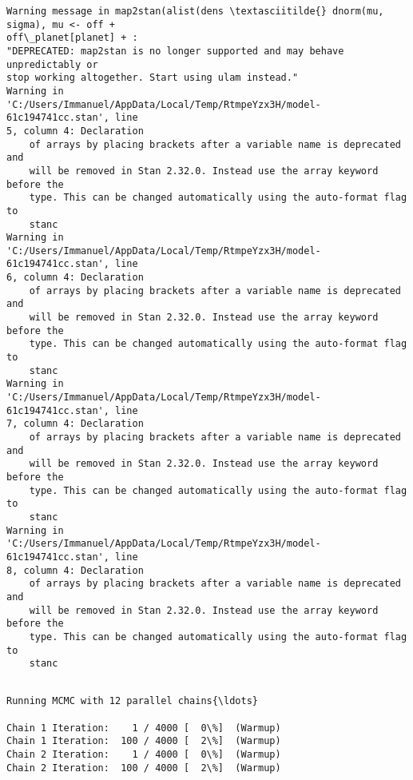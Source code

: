 \documentclass[11pt]{article}
\begin{document}
    \begin{Verbatim}[commandchars=\\\{\}]
Warning message in map2stan(alist(dens \textasciitilde{} dnorm(mu, sigma), mu <- off +
off\_planet[planet] + :
"DEPRECATED: map2stan is no longer supported and may behave unpredictably or
stop working altogether. Start using ulam instead."
Warning in
'C:/Users/Immanuel/AppData/Local/Temp/RtmpeYzx3H/model-61c194741cc.stan', line
5, column 4: Declaration
    of arrays by placing brackets after a variable name is deprecated and
    will be removed in Stan 2.32.0. Instead use the array keyword before the
    type. This can be changed automatically using the auto-format flag to
    stanc
Warning in
'C:/Users/Immanuel/AppData/Local/Temp/RtmpeYzx3H/model-61c194741cc.stan', line
6, column 4: Declaration
    of arrays by placing brackets after a variable name is deprecated and
    will be removed in Stan 2.32.0. Instead use the array keyword before the
    type. This can be changed automatically using the auto-format flag to
    stanc
Warning in
'C:/Users/Immanuel/AppData/Local/Temp/RtmpeYzx3H/model-61c194741cc.stan', line
7, column 4: Declaration
    of arrays by placing brackets after a variable name is deprecated and
    will be removed in Stan 2.32.0. Instead use the array keyword before the
    type. This can be changed automatically using the auto-format flag to
    stanc
Warning in
'C:/Users/Immanuel/AppData/Local/Temp/RtmpeYzx3H/model-61c194741cc.stan', line
8, column 4: Declaration
    of arrays by placing brackets after a variable name is deprecated and
    will be removed in Stan 2.32.0. Instead use the array keyword before the
    type. This can be changed automatically using the auto-format flag to
    stanc


    \end{Verbatim}

    \begin{Verbatim}[commandchars=\\\{\}]
Running MCMC with 12 parallel chains{\ldots}

Chain 1 Iteration:    1 / 4000 [  0\%]  (Warmup)
Chain 1 Iteration:  100 / 4000 [  2\%]  (Warmup)
Chain 2 Iteration:    1 / 4000 [  0\%]  (Warmup)
Chain 2 Iteration:  100 / 4000 [  2\%]  (Warmup)
    \end{Verbatim}
\end{document}
